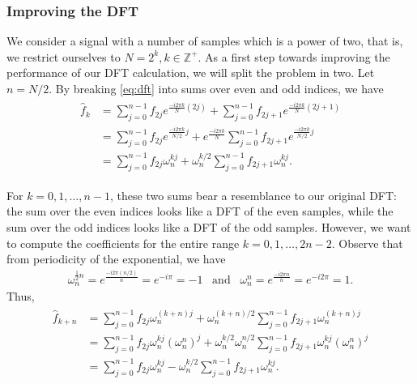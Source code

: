 \documentclass[10pt]{article}
\begin{document}
 
\subsubsection{Improving the DFT}


We consider a signal with a number of samples which is a power of two, that is, we restrict ourselves to \(N = 2^k, k \in \mathbb{Z^+}\). As a first step towards improving the performance of our DFT calculation, we will split the problem in two. Let \(n=N / 2\). By breaking \eqref{eq:dft} into sums over even and odd indices, we have
\begin{align}
    \begin{split}\label{eq:dft_split}
    \hat{f}_k &= \sum_{j=0}^{n-1} f_{2j} e^{\frac{-i2\pi k}{N}(2j)} + \sum_{j=0}^{n-1} f_{2j+1} e^{\frac{-i2\pi k}{N}(2j+1)} \\
    &= \sum_{j=0}^{n-1} f_{2j} e^{\frac{-i2\pi k}{N / 2}j} + e^{\frac{-i2\pi k}{N}} \sum_{j=0}^{n-1} f_{2j+1} e^{\frac{-i2\pi k}{N / 2}j} \\
    &= \sum_{j=0}^{n-1} f_{2j} \omega_n^{kj} + \omega_n^{k / 2} \sum_{j=0}^{n-1} f_{2j+1} \omega_n^{kj}.
    \end{split}
\end{align}

For \(k = 0, 1, \dots, n-1\), these two sums bear a resemblance to our original DFT: the sum over the even indices looks like a DFT of the even samples, while the sum over the odd indices looks like a DFT of the odd samples. However, we want to compute the coefficients for the entire range \(k = 0, 1, \dots, 2n-2\). Observe that from periodicity of the exponential, we have \begin{align*}
    \omega_n^{\frac{1}{2}n}  = e^{\frac{-i 2\pi (n / 2)}{n}} = e^{-i\pi} = -1\;\;\;\mathrm{and}\;\;\;\omega_n^{n} = e^{\frac{-i 2\pi n}{n}} = e^{-i 2\pi} = 1.
\end{align*} Thus, \begin{align}\label{eq:dft_split_2nd_half}
    \begin{split}
    \hat{f}_{k+n} &= \sum_{j=0}^{n-1} f_{2j} \omega_n^{(k+n)j} + \omega_n^{(k+n) / 2} \sum_{j=0}^{n-1} f_{2j+1} \omega_n^{(k+n)j} \\
    &= \sum_{j=0}^{n-1} f_{2j} \omega_n^{kj} \left(\omega_n^{n}\right)^j  + \omega_n^{k / 2} \omega_n^{n / 2} \sum_{j=0}^{n-1} f_{2j+1} \omega_n^{kj} \left(\omega_n^{n}\right)^j \\
    &= \sum_{j=0}^{n-1} f_{2j} \omega_n^{kj} - \omega_n^{k / 2}  \sum_{j=0}^{n-1} f_{2j+1} \omega_n^{kj}.
    \end{split}
\end{align}
\end{document}

